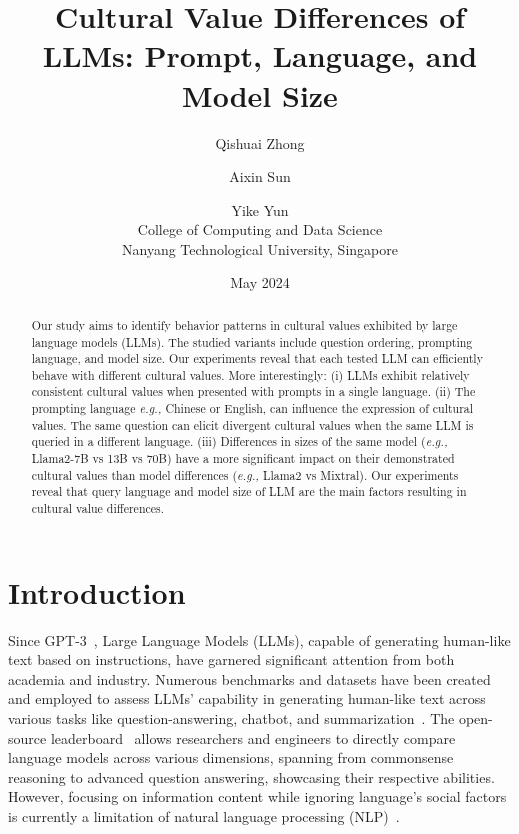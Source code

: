 \documentclass[11pt]{article}
\title{Cultural Value Differences of LLMs: Prompt, Language, and Model Size}
\author{Qishuai Zhong \and Aixin Sun \and Yike Yun \\
 College of Computing and Data Science \\
 Nanyang Technological University, Singapore}
\date{May 2024}
\newcommand{\eg}{\textit{e.g.,} \xspace}
\begin{document}
\maketitle

\begin{abstract}
Our study aims to identify behavior patterns in cultural values exhibited by large language models (LLMs). The studied variants include question ordering, prompting language, and model size. Our experiments reveal that each tested LLM can efficiently behave with different cultural values. More interestingly: (i) LLMs exhibit relatively consistent cultural values when presented with prompts in a single language. (ii) The prompting language \eg Chinese or English, can influence the expression of cultural values. The same question can elicit divergent cultural values when the same LLM is queried in a different language. (iii) Differences in sizes of the same model (\eg Llama2-7B vs 13B vs 70B) have a more significant impact on their demonstrated cultural values than model differences (\eg Llama2 vs Mixtral). Our experiments reveal that query language and model size of LLM are the main factors resulting in cultural value differences.

\end{abstract}

\section{Introduction}
\label{sec:intro}

Since GPT-3~\cite{brown2020language}, Large Language Models (LLMs), capable of generating human-like text based on instructions, have garnered significant attention from both academia and industry. Numerous benchmarks and datasets have been created and employed to assess LLMs' capability in generating human-like text across various tasks like question-answering, chatbot, and summarization~\cite{Clark2018ThinkYH,zellers2019hellaswag,hendryckstest2021}. The open-source leaderboard~\cite{Open-LLM-Leaderboard-Report-2023} allows researchers and engineers to directly compare language models across various dimensions, spanning from commonsense reasoning to advanced question answering, showcasing their respective abilities. However, focusing on information content while ignoring language's social factors is currently a limitation of natural language processing (NLP)~\cite{hovy-yang-2021-importance}.
\end{document}
